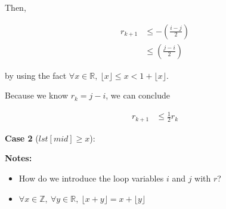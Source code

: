 \documentclass[12pt]{article}
\begin{document}
\begin{enumerate}[a.]
    \bigskip

    Then,

    \begin{align}
        r_{k+1} &\leq - \left( \frac{i - j}{2} \right)\\
        &\leq \left( \frac{j - i}{2} \right)
    \end{align}

    by using the fact $\forall x \in \mathbb{R},\: \lfloor x \rfloor \leq x < 1 + \lfloor x \rfloor$.

    \bigskip

    Because we know $r_k = j - i$, we can conclude

    \begin{align}
        r_{k+1} &\leq \frac{1}{2} r_k
    \end{align}

    \bigskip

    \textbf{Case 2} ($lst[mid] \geq x$):

    \bigskip

    \bigskip

    \textbf{Notes:}

    \begin{itemize}
        \item How do we introduce the loop variables $i$ and $j$ with $r$?
        \item $\forall x \in \mathbb{Z},\:\forall y \in \mathbb{R},\:\lfloor x+y \rfloor = x + \lfloor y \rfloor$
    \end{itemize}

\end{enumerate}
\end{document}
